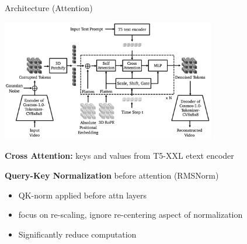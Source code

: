 \documentclass{beamer}
\begin{document}
\begin{frame}[t]{Architecture (Attention)}
    \vspace{-1.6em}
    \begin{center}
        \includegraphics[width=0.7\textwidth]{./img/diffusion_arch.png}
    \end{center}
    \textbf{Cross Attention:} keys and values from T5-XXL etext encoder\newline

    \textbf{Query-Key Normalization} before attention (RMSNorm) 
    \begin{itemize}[label=-]
        \item  QK-norm applied before attn layers
        \item  focus on re-scaling, ignore re-centering aspect of normalization
        \item Significantly reduce computation
   \end{itemize}
\end{frame}
\end{document}
